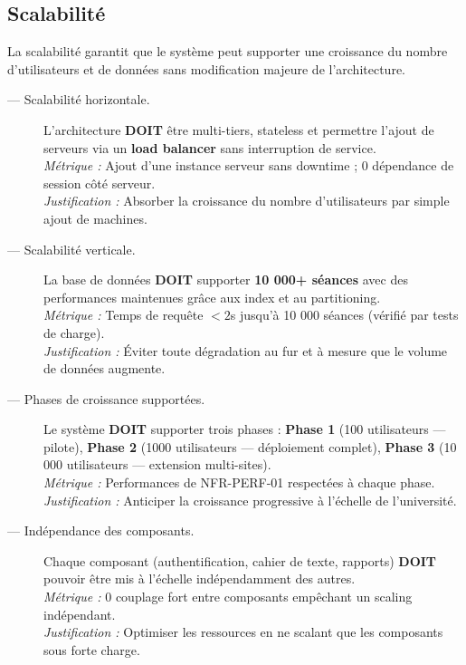 \subsection{Scalabilité}



La scalabilité garantit que le système peut supporter une croissance
du nombre d'utilisateurs et de données sans modification majeure
de l'architecture.

\begin{description}

    \item[ — Scalabilité horizontale.]
    L'architecture \textbf{DOIT} être multi-tiers, stateless et permettre
    l'ajout de serveurs via un \textbf{load balancer} sans interruption
    de service.\\
    \textit{Métrique :} Ajout d'une instance serveur sans downtime ;
    0 dépendance de session côté serveur.\\
    \textit{Justification :} Absorber la croissance du nombre d'utilisateurs
    par simple ajout de machines.

    \item[ — Scalabilité verticale.]
    La base de données \textbf{DOIT} supporter \textbf{10 000+ séances}
    avec des performances maintenues grâce aux index et au partitioning.\\
    \textit{Métrique :} Temps de requête $< 2$s jusqu'à 10 000 séances
    (vérifié par tests de charge).\\
    \textit{Justification :} Éviter toute dégradation au fur et à mesure
    que le volume de données augmente.

    \item[ — Phases de croissance supportées.]
    Le système \textbf{DOIT} supporter trois phases :
    \textbf{Phase 1} (100 utilisateurs — pilote),
    \textbf{Phase 2} (1000 utilisateurs — déploiement complet),
    \textbf{Phase 3} (10 000 utilisateurs — extension multi-sites).\\
    \textit{Métrique :} Performances de NFR-PERF-01 respectées
    à chaque phase.\\
    \textit{Justification :} Anticiper la croissance progressive
    à l'échelle de l'université.

    \item[ — Indépendance des composants.]
    Chaque composant (authentification, cahier de texte, rapports)
    \textbf{DOIT} pouvoir être mis à l'échelle indépendamment des autres.\\
    \textit{Métrique :} 0 couplage fort entre composants empêchant
    un scaling indépendant.\\
    \textit{Justification :} Optimiser les ressources en ne scalant
    que les composants sous forte charge.

\end{description}

